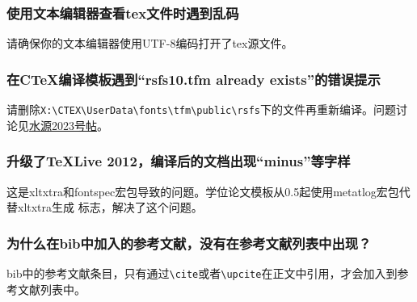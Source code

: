 \subsubsection*{使用文本编辑器查看tex文件时遇到乱码}
请确保你的文本编辑器使用UTF-8编码打开了tex源文件。

\subsubsection*{在CTeX编译模板遇到``rsfs10.tfm already exists''的错误提示}
请删除\verb+X:\CTEX\UserData\fonts\tfm\public\rsfs+下的文件再重新编译。问题讨论见\href{https://bbs.sjtu.edu.cn/bbstcon,board,TeX_LaTeX,reid,1352982719.html}{水源2023号帖}。

\subsubsection*{升级了TeXLive 2012，编译后的文档出现``minus''等字样}
这是xltxtra和fontspec宏包导致的问题。学位论文模板从0.5起使用metatlog宏包代替xltxtra生成 \XeTeX 标志，解决了这个问题。

\subsubsection*{为什么在bib中加入的参考文献，没有在参考文献列表中出现？}
bib中的参考文献条目，只有通过\verb+\cite+或者\verb+\upcite+在正文中引用，才会加入到参考文献列表中。

